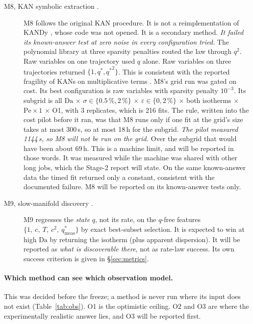 \documentclass[11pt]{article}
\newcommand{\Da}{\mathrm{Da}}
\newcommand{\Pe}{\mathrm{Pe}}
\newcommand{\qs}{q^{*}}
\newcommand{\qsm}{q^{*}_{\mathrm{meas}}}
\begin{document}
\begin{description}
\item[M8, KAN symbolic extraction \citep{liu2024}.] M8 follows the original KAN
procedure. It is not a reimplementation of KANDy \citep{slote2026}, whose code was not
opened. It is a secondary method. \emph{It failed its known-answer test at zero noise in
every configuration tried.} The polynomial library at three sparsity penalties routed the
law through $q^{2}$. Raw variables on one trajectory used $q$ alone. Raw variables on three
trajectories returned $\{1, \qs, {\qs}^{2}\}$. This is consistent with the reported
fragility of KANs on multiplicative terms \citep{spotorno2026}. M8's grid run was gated on
cost. Its best configuration is raw variables with sparsity penalty $10^{-3}$. Its subgrid
is all $\Da$ $\times$ $\sigma \in \{0.5\,\%, 2\,\%\}$ $\times$ $\varepsilon \in \{0, 2\,\%\}$
$\times$ both isotherms $\times$ $\Pe \times 1$ $\times$ O1, with 3 replicates, which is 216
fits. The rule, written into the cost pilot before it ran, was that M8 runs only if one fit
at the grid's size takes at most 300\,s, so at most 18\,h for the subgrid. \emph{The pilot
measured 1144\,s, so M8 will not be run on the grid.} Over the subgrid that would have
been about 69\,h. This is a machine limit, and will be reported in those words. It was
measured while the machine was shared with other long jobs, which the Stage-2 report will
state. On the same known-answer data the timed fit returned only a constant, consistent
with the documented failure. M8 will be reported on its known-answer tests only.

\item[M9, slow-manifold discovery \citep{delgado2025}.] M9 regresses the \emph{state} $q$,
not its rate, on the $q$-free features $\{1,\ c,\ T,\ c^{2},\ \qsm\}$ by exact best-subset
selection. It is expected to win at high $\Da$ by returning the isotherm (plus apparent
dispersion). It will be reported as \emph{what is discoverable there}, not as rate-law
success. Its own success criterion is given in \S\ref{sec:metrics}.
\end{description}

\paragraph{Which method can see which observation model.}
This was decided before the freeze; a method is never run where its input does not exist
(Table~\ref{tab:obs}). O1 is the optimistic ceiling. O2 and O3 are where the
experimentally realistic answer lies, and O3 will be reported first.
\end{document}
